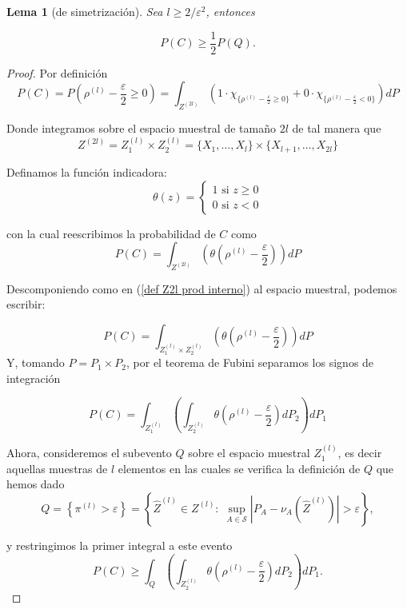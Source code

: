 \documentclass{report}
\newtheorem{lem}{Lema}[subsection]
\begin{document}
\begin{lem} [de simetrización]
    Sea \( l \geq 2 / \varepsilon^2 \), entonces

    \[
    P(C) \geq \frac{1}{2} P(Q).
    \]
\end{lem}
\begin{proof}
Por definición
\begin{equation*}
P(C) = P\left(\rho^{(l)}-\frac{\varepsilon}{2}\geq 0\right) = \int_{Z^{(2l)}} \left( 1 \cdot \chi_{\{\rho^{(l)}-\frac{\varepsilon}{2}\geq 0\}} + 
0 \cdot \chi_{\{\rho^{(l)}-\frac{\varepsilon}{2}< 0\}} \right) dP
\end{equation*}

Donde integramos sobre el espacio muestral de tamaño $2l$ de tal manera que
\begin{equation}
    Z^{(2l)} = Z_1^{(l)}\times Z_2^{(l)} = \{X_1,\dots,X_l\} \times \{X_{l+1},\dots,X_{2l}\} \label{def Z2l prod interno}
\end{equation}


Definamos la función indicadora: 
\[
\theta(z)=\begin{cases}
    1 \text{ si } z\geq 0 \\
    0 \text{ si } z< 0
\end{cases}  
\]

con la cual reescribimos la probabilidad de $C$ como
\begin{equation}
P(C) = \int_{Z^{(2l)}} \left( \theta\left(\rho^{(l)}-\frac{\varepsilon}{2}\right)\right) dP
\end{equation}

Descomponiendo como en (\ref{def Z2l prod interno}) al espacio muestral, podemos escribir:

\[
P(C) = \int_{Z_1^{(l)}\times Z_2^{(l)}} \left( \theta\left(\rho^{(l)}-\frac{\varepsilon}{2}\right)\right) dP
\]
Y, tomando $P=P_1\times P_2$, por el teorema de Fubini separamos los signos de integración

\[
P(C) = \int_{Z_1^{(l)}} \left( \int_{ Z_2^{(l)}}  \theta\left(\rho^{(l)}-\frac{\varepsilon}{2}\right) dP_2\right) dP_1
\]

Ahora, consideremos el subevento $Q$ sobre el espacio muestral $Z_1^{(l)}$, es decir aquellas muestras de $l$
elementos en las cuales se verifica la definición de $Q$ que hemos dado
\[
Q = \left\{ \pi^{(l)} > \varepsilon \right\} = \left\{\hat{Z}^{(l)}\in Z^{(l)}:\; 
\sup_{A\in\mathcal{S}}\left|P_A - \nu_A\left(\hat{Z}^{(l)}\right)\right| > \varepsilon \right\},
\]

y restringimos la primer integral a este evento
\begin{equation}
P(C) \geq \int_{Q} \left( \int_{ Z_2^{(l)}}  \theta\left(\rho^{(l)}-\frac{\varepsilon}{2}\right) dP_2\right) dP_1. \label{desigualdad P(C)}
\end{equation}


\end{proof}
\end{document}
